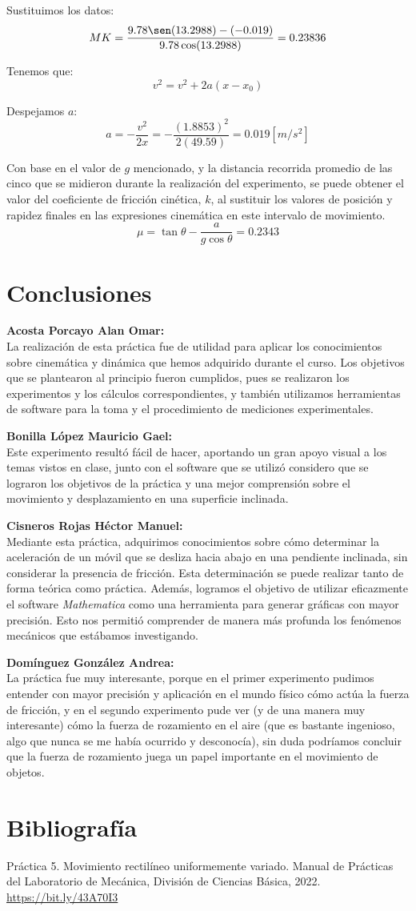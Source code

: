 \documentclass[12pt, titlepage]{report}
\begin{document}
    Sustituimos los datos:
    $$MK = \frac{9.78\sen(13.2988) - (-0.019)}{9.78\cos(13.2988)} = 0.23836$$

    Tenemos que:
    $$v^2 = v^2 + 2a(x - x_0)$$

    Despejamos $a$:
    $$a = -\frac{v^2}{2x} = -\frac{(1.8853)^2}{2(49.59)} = 0.019[m/s^2]$$

    Con base en el valor de $g$ mencionado, y la distancia recorrida promedio de las cinco que se midieron durante la realización del experimento, se puede obtener el valor del coeficiente de fricción cinética, $k$, al sustituir los valores de posición y rapidez finales en las expresiones cinemática en este intervalo de movimiento.
    $$\mu = \tan\theta - \frac{a}{g\cos\theta} = 0.2343$$

    \newpage
    \section*{Conclusiones}
    \textbf{Acosta Porcayo Alan Omar:}\\
    La realización de esta práctica fue de utilidad para aplicar los conocimientos sobre cinemática y dinámica que hemos adquirido durante el curso. Los objetivos que se plantearon al principio fueron cumplidos, pues se realizaron los experimentos y los cálculos correspondientes, y también utilizamos herramientas de software para la toma y el procedimiento de mediciones experimentales. 
    
    \textbf{Bonilla López Mauricio Gael:}\\
    Este experimento resultó fácil de hacer, aportando un gran apoyo visual a los temas vistos en clase, junto con el software que se utilizó considero que se lograron los objetivos de la práctica y una mejor comprensión sobre el movimiento y desplazamiento en una superficie inclinada.
    
    \textbf{Cisneros Rojas Héctor Manuel:}\\
    Mediante esta práctica, adquirimos conocimientos sobre cómo determinar la aceleración de un móvil que se desliza hacia abajo en una pendiente inclinada, sin considerar la presencia de fricción. Esta determinación se puede realizar tanto de forma teórica como práctica. Además, logramos el objetivo de utilizar eficazmente el software \textit{Mathematica} como una herramienta para generar gráficas con mayor precisión. Esto nos permitió comprender de manera más profunda los fenómenos mecánicos que estábamos investigando.
    
    \textbf{Domínguez González Andrea:}\\
    La práctica fue muy interesante, porque en el primer experimento pudimos entender con mayor precisión y aplicación en el mundo físico cómo actúa la fuerza de fricción, y en el segundo experimento pude ver (y de una manera muy interesante) cómo la fuerza de rozamiento en el aire (que es bastante ingenioso, algo que nunca se me había ocurrido y desconocía), sin duda podríamos concluir que la fuerza de rozamiento juega un papel importante en el movimiento de objetos.

    \section*{Bibliografía}
    Práctica 5. Movimiento rectilíneo uniformemente variado. Manual de Prácticas del Laboratorio de Mecánica, División de Ciencias Básica, 2022. \url{https://bit.ly/43A70I3}
    
\end{document}

